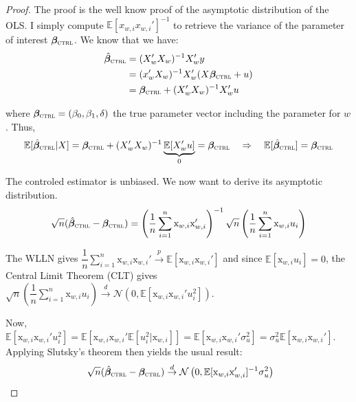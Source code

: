 \documentclass[a4paper, 11pt]{report}
\begin{document}
			\begin{proof}
				The proof is the well know proof of the asymptotic distribution of the OLS. I simply compute $\mathbb{E}[x_{w, i}x_{w, i}']^{-1}$ to retrieve the variance of the parameter of interest $\bm{\beta}_{\textsc{ctrl}}$. We know that we have:
			~
			\begin{align*}
				 \hat{\bm{\beta}}_{\textsc{ctrl}} & =  (X_{w}'X_{w})^{-1}X_{w}'y\\
				 	& = (x_{w}'X_{w})^{-1}X_{w}'(X\bm{\beta}_{\textsc{ctrl}} + u)\\
				 	& = \bm{\beta}_{\textsc{ctrl}} + (X_{w}'X_{w})^{-1}X_{w}'u
			\end{align*}
			
			where $\bm{\beta}_{\textsc{ctrl}} = (\beta_{0}, \beta_{1}, \delta)$ the true parameter vector including the parameter for $w$.
			Thus,
			~
			\begin{equation*}
				\mathbb{E}[ \hat{\bm{\beta}}_{\textsc{ctrl}} | X]  =  \bm{\beta}_{\textsc{ctrl}} + (X_{w}'X_{w})^{-1}\underbrace{\mathbb{E}[X_{w}'u]}_{0} = \bm{\beta}_{\textsc{ctrl}}
				\quad \Rightarrow \quad
				\mathbb{E}[ \hat{\bm{\beta}}_{\textsc{ctrl}}]  = \bm{\beta}_{\textsc{ctrl}}
			\end{equation*}
			
			The controled estimator is unbiased. We now want to derive its asymptotic distribution.
				~
				\begin{equation*}
					\sqrt{n}(\hat{\bm{\beta}}_{\textsc{ctrl}} - \bm{\beta}_{\textsc{ctrl}}) 
						=  \left(\dfrac{1}{n} \sum_{i = 1}^{n} \text{x}_{w, i} \text{x}_{w, i}' \right)^{-1}  \sqrt{n} \left(\dfrac{1}{n} \sum_{i = 1}^{n} \text{x}_{w, i} u_{i} \right) 
				\end{equation*}	
				
			The WLLN gives $\dfrac{1}{n} \sum_{i = 1}^{n} \text{x}_{w, i} \text{x}_{w, i}'  \overset{p}{\to}  \mathbb{E}[\text{x}_{w, i}\text{x}_{w, i}']$ and since $\mathbb{E}[\text{x}_{w, i}u_{i}] = 0$, the Central Limit Theorem (CLT) gives $\sqrt{n} \left(\dfrac{1}{n} \sum_{i = 1}^{n} \text{x}_{w, i} u_{i} \right) \overset{d}{\to} \mathcal{N}(0, \mathbb{E}[\text{x}_{w, i}\text{x}_{w, i}'u_{i}^{2}])$.  
			
			Now, $\mathbb{E}[\text{x}_{w, i}\text{x}_{w, i}'u_{i}^{2}]  = 
				\mathbb{E}[\text{x}_{w, i}\text{x}_{w, i}'\mathbb{E}[u_{i}^{2} | \text{x}_{w, i}]] = 
				\mathbb{E}[\text{x}_{w, i}\text{x}_{w, i}'\sigma_{u}^{2}] = 
				\sigma_{u}^{2}\mathbb{E}[\text{x}_{w, i}\text{x}_{w, i}']$. Applying Slutsky's theorem then yields the usual result:
				~
				\[ \sqrt{n}(\hat{\bm{\beta}}_{\textsc{ctrl}} - \bm{\beta}_{\textsc{ctrl}}) \overset{d}{\to} 
					\mathcal{N}\left(0,  \mathbb{E}[\text{x}_{w, i}\text{x}_{w, i}']^{-1} \sigma_{u}^{2} \right) \]
			

\end{proof}
\end{document}
